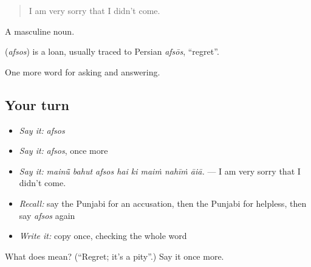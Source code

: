 \begin{quote}
I am very sorry that I didn't come.
\end{quote}

A masculine noun.

\begin{cousinweb}
\textbf{} (\emph{afsos}) is a loan, usually traced to Persian \emph{afsōs}, \textquotedblleft{}regret\textquotedblright{}.
\end{cousinweb}

\begin{grammarlens}[title={What you've built}]
One more word for asking and answering.
\end{grammarlens}

\subsection*{Your turn}
\begin{itemize}
\raggedright
  \item \emph{Say it:} \emph{afsos}
  \item \emph{Say it:} \emph{afsos}, once more
  \item \emph{Say it:} \emph{mainū̃ bahut afsos hai ki maiṁ nahīṁ āiā.} — I am very sorry that I didn't come.
  \item \emph{Recall:} say the Punjabi for an accusation, then the Punjabi for helpless, then say \emph{afsos} again
  \item \emph{Write it:} copy \textbf{} once, checking the whole word
\end{itemize}

\begin{tcolorbox}[breakable,colback=teal!4,colframe=teal!35!black,title={Before you move on}]
What does  mean? (\textquotedblleft{}Regret; it's a pity\textquotedblright{}.) Say it once more.
\end{tcolorbox}
